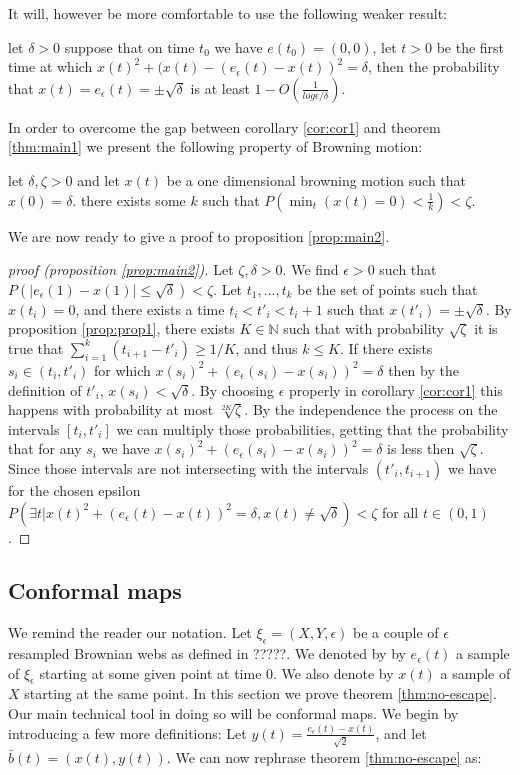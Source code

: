 {It will, however be more comfortable to use the following weaker result:
\begin{cor}\label{cor:cor1}
let $\delta>0$ suppose that on time $t_0$ we have $e(t_0)=(0,0)$, let $t>0$ be the first time at which $x(t)^2+(x(t)-(e_\epsilon(t)-x(t))^2=\delta$, then the probability that $x(t)=e_\epsilon(t)=\pm\sqrt\delta$ is at least $1-O(\frac{1}{log\epsilon/\delta})$.
\end{cor}

In order to overcome the gap between corollary \ref{cor:cor1} and theorem \ref{thm:main1} we present the following property of Browning motion:
\begin{propos}\label{prop:prop1}
let $\delta,\zeta>0$ and let $x(t)$ be a one dimensional browning motion such that $x(0)=\delta$. there exists some $k$ such that $P(\min_t(x(t)=0)<\frac1k)<\zeta$.
\end{propos}

We are now ready to give a proof to proposition \ref{prop:main2}.

\begin{proof}[proof (proposition \ref{prop:main2})]
Let $\zeta,\delta>0$. We find $\epsilon>0$ such that $P(|e_\epsilon(1)- x(1)|\le\sqrt\delta)<\zeta$. Let $t_1,...,t_k$ be the set of points such that $x(t_i)=0$,
and there exists a time $t_i<t'_i<t_i+1$ such that $x(t'_i)=\pm\sqrt\delta$. By proposition \ref{prop:prop1}, there exists $K\in\mathbb{N}$ such that with probability
$\sqrt\zeta$ it is true that $\sum_{i=1}^k(t_{i+1}-t'_i)\ge1/K$, and thus $k\le K$. If there exists $s_i\in (t_i, t'_i)$ for which $x(s_i)^2+(e_\epsilon(s_i)-x(s_i))^2=\delta$ then by the definition of $t'_i$, $x(s_i)<\sqrt\delta$. By choosing $\epsilon$ properly in corollary \ref{cor:cor1}  this happens with probability at most $\sqrt[2K]{\zeta}$. By the independence the process on the  intervals $[t_i,t'_i]$ we can multiply those probabilities, getting that the probability that for any $s_i$ we have $x(s_i)^2+(e_\epsilon(s_i)-x(s_i))^2=\delta$ is less then $\sqrt\zeta$. Since those intervals are not intersecting with the intervals $(t'_i,t_{i+1})$ we have for the chosen epsilon $P(\exists t | x(t)^2+(e_\epsilon(t)-x(t))^2=\delta, x(t)\neq \sqrt \delta)<\zeta$ for all $t\in(0,1)$.
\end{proof}

\subsection{Conformal maps}\label{sec:conformal map}
We remind the reader our notation. Let $\xi_\epsilon=(X,Y,\epsilon)$ be a couple of $\epsilon$ resampled Brownian webs as defined in ?????. We denoted by by $e_\epsilon(t)$ a sample of $\xi_\epsilon$ starting at some given point at time $0$. We also denote by $x(t)$ a sample of $X$ starting at the same point.
In this section we prove theorem \ref{thm:no-escape}. Our main technical tool in doing so will be conformal maps. We begin by introducing a few more definitions:
Let $y(t)=\frac{e_\epsilon(t)-x(t)}{\sqrt2}$, and let $\bar{b}(t)=(x(t),y(t))$. We can now rephrase theorem \ref{thm:no-escape} as:

}
